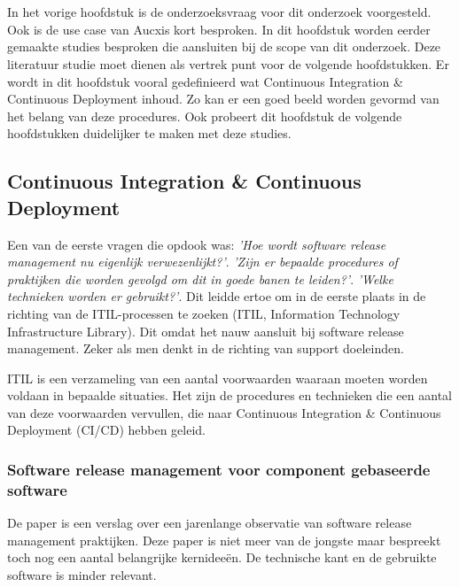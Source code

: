 \chapter{}
\label{ch:stand-van-zaken}
In het vorige hoofdstuk is de onderzoeksvraag voor dit onderzoek voorgesteld. Ook is de use case van Aucxis kort besproken. In dit hoofdstuk worden eerder gemaakte studies besproken die aansluiten bij de scope van dit onderzoek. Deze literatuur studie moet dienen als vertrek punt voor de volgende hoofdstukken. Er wordt in dit hoofdstuk vooral gedefinieerd wat Continuous Integration \& Continuous Deployment inhoud. Zo kan er een goed beeld worden gevormd van het belang van deze procedures. Ook probeert dit hoofdstuk de volgende hoofdstukken duidelijker te maken met deze studies.

\section{Continuous Integration \& Continuous Deployment}
Een van de eerste vragen die opdook was: \emph{'Hoe wordt software release management nu eigenlijk verwezenlijkt?'}. \emph{'Zijn er bepaalde procedures of praktijken die worden gevolgd om dit in goede banen te leiden?'}. \emph{'Welke technieken worden er gebruikt?'}. Dit leidde ertoe om in de eerste plaats in de richting van de ITIL-processen te zoeken (ITIL, Information Technology Infrastructure Library). Dit omdat het nauw aansluit bij software release management. Zeker als men denkt in de richting van support doeleinden. 

ITIL is een verzameling van een aantal voorwaarden waaraan moeten worden voldaan in bepaalde situaties. Het zijn de procedures en technieken die een aantal van deze voorwaarden vervullen, die naar Continuous Integration \& Continuous Deployment (CI/CD) hebben geleid. 

\subsection{Software release management voor component gebaseerde software}
De paper \autocite{Hoek2002} is een verslag over een jarenlange observatie van software release management praktijken. Deze paper is niet meer van de jongste maar bespreekt toch nog een aantal belangrijke kernideeën. De technische kant en de gebruikte software is minder relevant.

